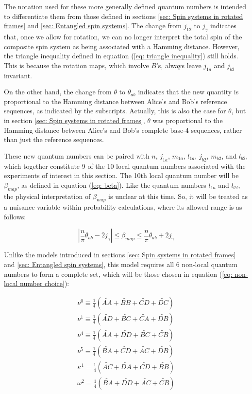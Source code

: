 \documentclass{article}
\begin{document}
The notation used for these more generally defined quantum numbers is intended to differentiate them from those defined in sections \ref{sec: Spin systems in rotated frames} and \ref{sec: Entangled spin systems}. The change from $j_{12}$ to $j_\gamma$ indicates that, once we allow for rotation, we can no longer interpret the total spin of the composite spin system as being associated with a Hamming distance. However, the triangle inequality defined in equation (\ref{eq: triangle inequality}) still holds. This is because the rotation maps, which involve $B$'s, always leave $j_{1a}$ and $j_{b2}$ invariant. 

On the other hand, the change from $\theta$ to $\theta_{ab}$ indicates that the new quantity is proportional to the Hamming distance between Alice's and Bob's reference sequences, as indicated by the subscripts. Actually, this is also the case for $\theta$, but in section \ref{sec: Spin systems in rotated frames}, $\theta$ was proportional to the Hamming distance between Alice's and Bob's complete base-4 sequences, rather than just the reference sequences.

These new quantum numbers can be paired with $n$, $j_{1a}$, $m_{1a}$, $l_{1a}$, $j_{b2}$, $m_{b2}$, and $l_{b2}$, which together constitute 9 of the 10 local quantum numbers associated with the experiments of interest in this section. The 10th local quantum number will be $\beta_{map}$, as defined in equation (\ref{eq: beta}). Like the quantum numbers $l_{1a}$ and $l_{b2}$, the physical interpretation of $\beta_{map}$ is unclear at this time. So, it will be treated as a nuisance variable within probability calculations, where its allowed range is as follows:

\begin{equation}
    |\frac{n}{\pi}\theta_{ab}-2j_{\gamma}|\leq \beta_{map} \leq \frac{n}{\pi}\theta_{ab}+2j_{\gamma}
\end{equation}

Unlike the models introduced in sections \ref{sec: Spin systems in rotated frames} and \ref{sec: Entangled spin systems}, this model requires all 6 non-local quantum numbers to form a complete set, which will be those chosen in equation (\ref{eq: non-local number choice}):

\begin{equation}
\begin{array}{cc}
    \nu^{0}\equiv\frac{1}{4}( \widetilde{AA}+\widetilde{BB}+\widetilde{CD}+\widetilde{DC})\\ 
    \nu^{1}\equiv\frac{1}{4}( \widetilde{AD}+\widetilde{BC}+\widetilde{CA}+\widetilde{DB})\\
    \nu^{4}\equiv\frac{1}{4}( \widetilde{AA}+\widetilde{DD}+\widetilde{BC}+\widetilde{CB})\\
    \nu^{5}\equiv\frac{1}{4}( \widetilde{BA}+\widetilde{CD}+\widetilde{AC}+\widetilde{DB})\\
    \kappa^{1}=\frac{1}{4}( \widetilde{AC}+\widetilde{DA}+\widetilde{CD}+\widetilde{BB})\\
    \omega^2=\frac{1}{4}( \widetilde{BA}+\widetilde{DD}+\widetilde{AC}+\widetilde{CB})
\end{array}
\end{equation}
\end{document}
